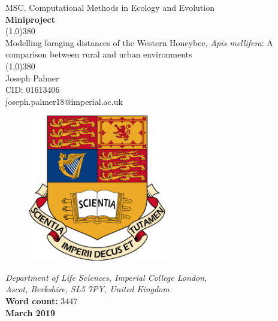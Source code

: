 \documentclass[11pt]{article}
\begin{document}
\begin{titlepage}
\begin{center}
	\large{MSC. Computational Methods in Ecology and Evolution }\\
	\textbf{ Miniproject }\\[0cm]
	\huge{\line(1,0){380}\\
		Modelling foraging distances of the Western Honeybee, \textit{Apis mellifera}: A comparison between rural and urban environments\\
	\line(1,0){380}}\\[1cm]
	\large{ Joseph Palmer\\ CID: 01613406}\\[0cm]
	{joseph.palmer18@imperial.ac.uk }\\[1.2cm]
	\begin{figure}[h]
	\includegraphics[width=6cm]{../Writeup/WriteupImages/ImperialCrest.png}
	\centering
	\end{figure}
	\normalsize{\textit{Department of Life Sciences, Imperial College London,}\\
		\textit{Ascot, Berkshire, SL5 7PY, United Kingdom}}\\[0.5cm]
	\small{\textbf{Word count:} 3447}\\
	\small{\textbf{March 2019}}
\end{center}
\end{titlepage}
\newpage
\tableofcontents
\newpage
\end{document}
